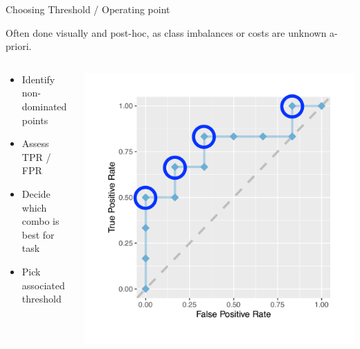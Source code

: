 \documentclass[11pt,compress,t,notes=noshow, xcolor=table]{beamer}
\begin{document}
\begin{vbframe}{Choosing Threshold / Operating point}

Often done visually and post-hoc, as class imbalances or costs are unknown a-priori.

\lz

\begin{columns}
\begin{column}{0.6\textwidth}
\begin{itemize}
  \item Identify non-dominated points
  \item Assess TPR / FPR
  \item Decide which combo is best for task
  \item Pick associated threshold
\end{itemize}
\end{column}

\begin{column}{0.4\textwidth}
\begin{center}
  \includegraphics[width=\textwidth,trim={1.5cm 0 0 1.5cm},clip]{figure/eval_mclass_roc_sp_4a.pdf}
\end{center}
\end{column}
\end{columns}
\end{vbframe}
\end{document}
